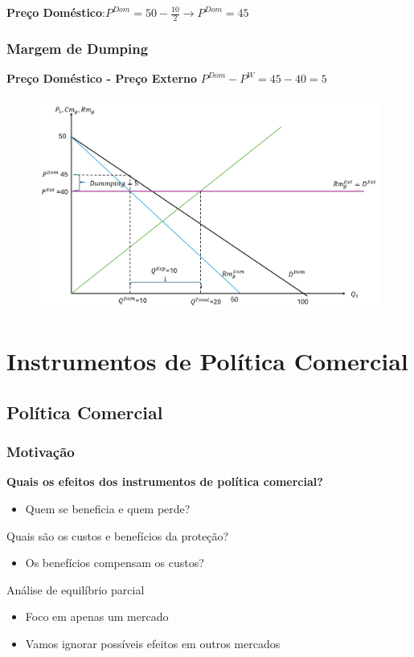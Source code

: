 \documentclass[a4paper,12pt]{article}[abntex2]
\begin{document}
\textbf{Preço Doméstico}:\(P^{Dom}=50-\frac{10}{2}\rightarrow P^{Dom}=45\)

\subsubsection{\textbf{Margem de Dumping}}

\textbf{Preço Doméstico - Preço Externo} \(P^{Dom}-P^{W}=45-40=5\)

\begin{figure}[H]
    \centering
    \includegraphics[width=0.7\linewidth]{Imagens/a19i6.png}
\end{figure}

\newpage
\section{\textbf{Instrumentos de Política Comercial}}
\subsection{\textbf{Política Comercial}}
\subsubsection{\textbf{Motivação}}
\textbf{Quais os efeitos dos instrumentos de política comercial?}
\begin{itemize}
  \item Quem se beneficia e quem perde?
\end{itemize}

Quais são os custos e benefícios da proteção?
\begin{itemize}
  \item Os benefícios compensam os custos?
\end{itemize}

Análise de equilíbrio parcial
\begin{itemize}
  \item Foco em apenas um mercado
  \item Vamos ignorar possíveis efeitos em outros mercados
\end{itemize}
\end{document}
